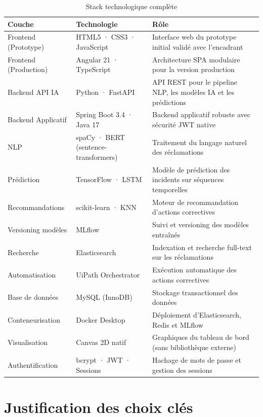 \documentclass[12pt,a4paper]{report}
\begin{document}
\begin{table}[H]
\centering
\caption{Stack technologique complète}
\begin{tabularx}{\textwidth}{|l|l|X|}
\hline
\textbf{Couche} & \textbf{Technologie} & \textbf{Rôle} \\
\hline
Frontend (Prototype) & HTML5 · CSS3 · JavaScript & Interface web du prototype initial validé avec l'encadrant \\
\hline
Frontend (Production) & Angular 21 · TypeScript & Architecture SPA modulaire pour la version production \\
\hline
Backend API IA & Python · FastAPI & API REST pour le pipeline NLP, les modèles IA et les prédictions \\
\hline
Backend Applicatif & Spring Boot 3.4 · Java 17 & Backend applicatif robuste avec sécurité JWT native \\
\hline
NLP & spaCy · BERT (sentence-transformers) & Traitement du langage naturel des réclamations \\
\hline
Prédiction & TensorFlow · LSTM & Modèle de prédiction des incidents sur séquences temporelles \\
\hline
Recommandations & scikit-learn · KNN & Moteur de recommandation d'actions correctives \\
\hline
Versioning modèles & MLflow & Suivi et versioning des modèles entraînés \\
\hline
Recherche & Elasticsearch & Indexation et recherche full-text sur les réclamations \\
\hline
Automatisation & UiPath Orchestrator & Exécution automatique des actions correctives \\
\hline
Base de données & MySQL (InnoDB) & Stockage transactionnel des données \\
\hline
Conteneurisation & Docker Desktop & Déploiement d'Elasticsearch, Redis et MLflow \\
\hline
Visualisation & Canvas 2D natif & Graphiques du tableau de bord (sans bibliothèque externe) \\
\hline
Authentification & bcrypt · JWT · Sessions & Hachage de mots de passe et gestion des sessions \\
\hline
\end{tabularx}
\end{table}

\section{Justification des choix clés}
\end{document}
